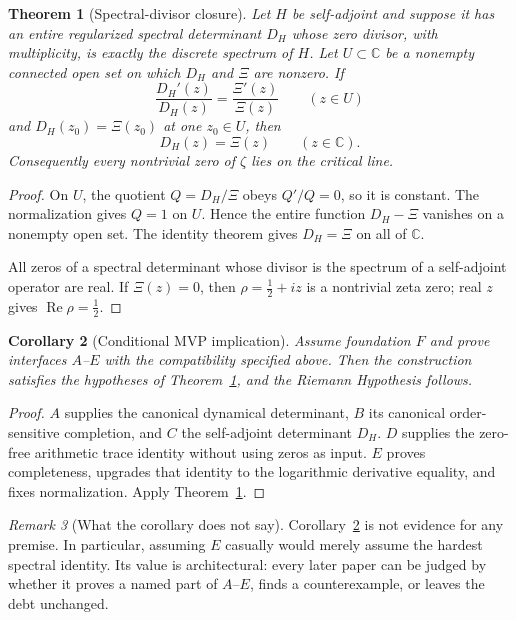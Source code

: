 \documentclass[11pt]{article}
\newtheorem{theorem}{Theorem}[section]
\newtheorem{corollary}[theorem]{Corollary}
\theoremstyle{definition}
\theoremstyle{remark}
\newtheorem{remark}[theorem]{Remark}
\begin{document}
\begin{theorem}[Spectral-divisor closure]\label{thm:closure}
Let $H$ be self-adjoint and suppose it has an entire regularized spectral
determinant $D_H$ whose zero divisor, with multiplicity, is exactly the
discrete spectrum of $H$.  Let $U\subset\mathbb C$ be a nonempty connected
open set on which $D_H$ and $\Xi$ are nonzero.  If
\[
 \frac{D_H'(z)}{D_H(z)}=\frac{\Xi'(z)}{\Xi(z)}
 \qquad(z\in U)
\]
and $D_H(z_0)=\Xi(z_0)$ at one $z_0\in U$, then
\[
 D_H(z)=\Xi(z)\qquad(z\in\mathbb C).
\]
Consequently every nontrivial zero of $\zeta$ lies on the critical line.
\end{theorem}
\begin{proof}
On $U$, the quotient $Q=D_H/\Xi$ obeys $Q'/Q=0$, so it is constant.
The normalization gives $Q=1$ on $U$.  Hence the entire function
$D_H-\Xi$ vanishes on a nonempty open set.  The identity theorem gives
$D_H=\Xi$ on all of $\mathbb C$.

All zeros of a spectral determinant whose divisor is the spectrum of a
self-adjoint operator are real.  If $\Xi(z)=0$, then
$\rho=\tfrac12+iz$ is a nontrivial zeta zero; real $z$ gives
$\operatorname{Re}\rho=\tfrac12$.
\end{proof}

\begin{corollary}[Conditional MVP implication]\label{cor:mvp}
Assume foundation $F$ and prove interfaces $A$--$E$ with the compatibility
specified above.  Then the construction satisfies the hypotheses of
Theorem~\ref{thm:closure}, and the Riemann Hypothesis follows.
\end{corollary}
\begin{proof}
$A$ supplies the canonical dynamical determinant, $B$ its canonical
order-sensitive completion, and $C$ the self-adjoint determinant $D_H$.
$D$ supplies the zero-free arithmetic trace identity without using zeros as
input.  $E$ proves completeness, upgrades that identity to the logarithmic
derivative equality, and fixes normalization.  Apply
Theorem~\ref{thm:closure}.
\end{proof}

\begin{remark}[What the corollary does not say]
Corollary~\ref{cor:mvp} is not evidence for any premise.  In particular,
assuming $E$ casually would merely assume the hardest spectral identity.
Its value is architectural: every later paper can be judged by whether it
proves a named part of $A$--$E$, finds a counterexample, or leaves the debt
unchanged.
\end{remark}
\end{document}
